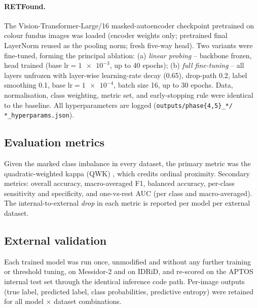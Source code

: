 \documentclass[11pt,a4paper]{article}
\begin{document}
\paragraph{RETFound.} The Vision-Transformer-Large/16
\citep{dosovitskiy2021vit} masked-autoencoder \citep{he2022mae} checkpoint
pretrained on colour fundus images \citep{zhou2023retfound} was loaded (encoder
weights only; pretrained final LayerNorm reused as the pooling norm; fresh
five-way head). Two variants were fine-tuned, forming the principal ablation:
(a) \emph{linear probing} -- backbone frozen, head trained (base
$\text{lr}=\num{1e-3}$, up to 40 epochs); (b) \emph{full fine-tuning} -- all
layers unfrozen with layer-wise learning-rate decay (0.65), drop-path 0.2, label
smoothing 0.1, base $\text{lr}=\num{1e-4}$, batch size 16, up to 30 epochs.
Data, normalisation, class weighting, metric set, and early-stopping rule were
identical to the baseline. All hyperparameters are logged
(\texttt{outputs/phase\{4,5\}\_*/\,*\_hyperparams.json}).

\subsection{Evaluation metrics}

Given the marked class imbalance in every dataset, the primary metric was the
quadratic-weighted kappa (QWK) \citep{cohen1968kappa}, which credits ordinal
proximity. Secondary
metrics: overall accuracy, macro-averaged F1, balanced accuracy, per-class
sensitivity and specificity, and one-vs-rest AUC (per class and macro-averaged).
The internal-to-external \emph{drop} in each metric is reported per model per
external dataset.

\subsection{External validation}
\label{sec:external}

Each trained model was run once, unmodified and without any further training or
threshold tuning, on Messidor-2 and on IDRiD, and re-scored on the APTOS
internal test set through the identical inference code path. Per-image outputs
(true label, predicted label, class probabilities, predictive entropy) were
retained for all model $\times$ dataset combinations.
\end{document}
